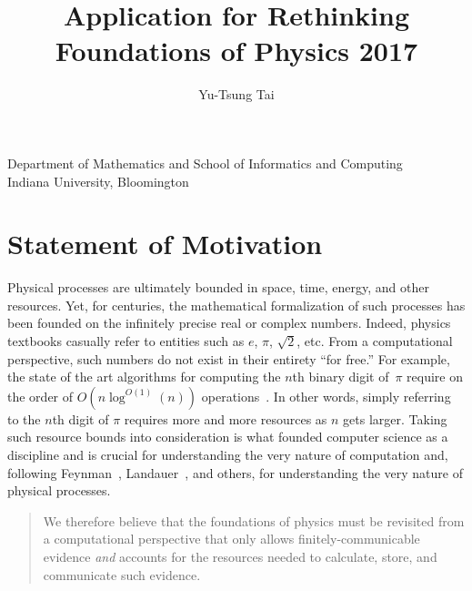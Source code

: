 \documentclass{article}
\newcommand{\lyxaddress}[1]{
\par {\raggedright #1
\vspace{1.4em}
\noindent\par}
}
\theoremstyle{remark}
\begin{document}
\title{Application for Rethinking Foundations of Physics 2017}

\author{Yu-Tsung Tai}
\maketitle

\lyxaddress{Department of Mathematics and School of Informatics and Computing\\
Indiana University, Bloomington}

\section{Statement of Motivation}

Physical processes are ultimately bounded in space, time, energy, and
other resources. Yet, for centuries, the mathematical formalization of
such processes has been founded on the infinitely precise real or
complex numbers. Indeed, physics textbooks casually refer to entities
such as $e$, $\pi$, $\sqrt{2}$, etc. From a computational perspective,
such numbers do not exist in their entirety ``for free.''  For
example, the state of the art algorithms for computing the $n$th
binary digit of~$\pi$ require on the order of $O(n\log^{O(1)}(n))$
operations~\cite{journals/moc/BaileyBP97}. In other words, simply
referring to the $n$th digit of $\pi$ requires more and more resources
as $n$ gets larger. Taking such resource bounds into consideration is
what founded computer science as a discipline and is crucial for
understanding the very nature of computation and, following
Feynman~\cite{Feynman1982Simulating}, Landauer~\cite{Landauer1996188},
and others, for understanding the very nature of physical processes.
 
\begin{quote}
  We therefore believe that the foundations of physics must be
  revisited from a computational perspective that only allows
  finitely-communicable evidence \emph{and} accounts for the resources
  needed to calculate, store, and communicate such evidence.
\end{quote}
\end{document}
